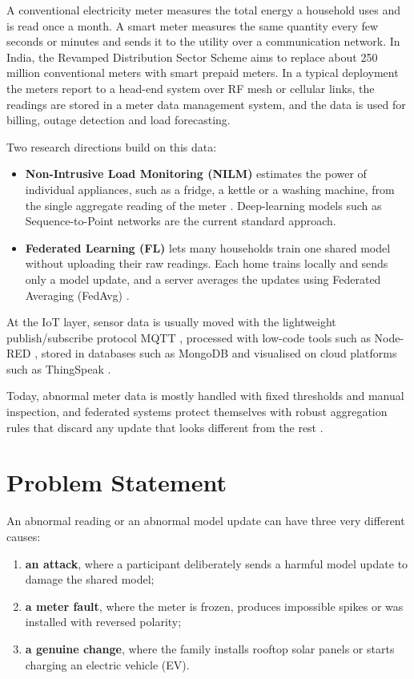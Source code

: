 \documentclass[12pt,a4paper,oneside]{report}
\begin{document}
A conventional electricity meter measures the total energy a household uses and is read once a month. A smart meter measures the same quantity every few seconds or minutes and sends it to the utility over a communication network. In India, the Revamped Distribution Sector Scheme aims to replace about 250 million conventional meters with smart prepaid meters. In a typical deployment the meters report to a head-end system over RF mesh or cellular links, the readings are stored in a meter data management system, and the data is used for billing, outage detection and load forecasting.

Two research directions build on this data:

\begin{itemize}
\item \textbf{Non-Intrusive Load Monitoring (NILM)} estimates the power of individual appliances, such as a fridge, a kettle or a washing machine, from the single aggregate reading of the meter \cite{hart}. Deep-learning models such as Sequence-to-Point networks \cite{s2p} are the current standard approach.
\item \textbf{Federated Learning (FL)} lets many households train one shared model without uploading their raw readings. Each home trains locally and sends only a model update, and a server averages the updates using Federated Averaging (FedAvg) \cite{fedavg}.
\end{itemize}

At the IoT layer, sensor data is usually moved with the lightweight publish/subscribe protocol MQTT \cite{mqtt}, processed with low-code tools such as Node-RED \cite{nodered}, stored in databases such as MongoDB \cite{mongodb} and visualised on cloud platforms such as ThingSpeak \cite{thingspeak}.

Today, abnormal meter data is mostly handled with fixed thresholds and manual inspection, and federated systems protect themselves with robust aggregation rules that discard any update that looks different from the rest \cite{krum,trimmed,fltrust}.

\section{Problem Statement}

An abnormal reading or an abnormal model update can have three very different causes:

\begin{enumerate}
\item \textbf{an attack}, where a participant deliberately sends a harmful model update to damage the shared model;
\item \textbf{a meter fault}, where the meter is frozen, produces impossible spikes or was installed with reversed polarity;
\item \textbf{a genuine change}, where the family installs rooftop solar panels or starts charging an electric vehicle (EV).
\end{enumerate}
\end{document}
